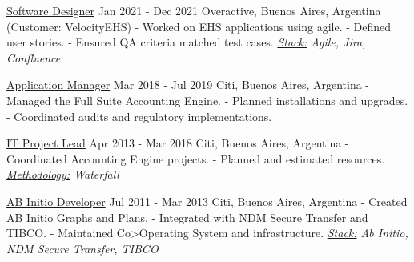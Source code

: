 \documentclass[
	a4paper,
	showframes,
]{ThirtyNinesecondscv}
\begin{document}
{\large\underline{Software Designer}}  \hspace*{22pt} Jan 2021 - Dec 2021
\newline\newline
Overactive, Buenos Aires, Argentina (Customer: VelocityEHS)
\newline- Worked on EHS applications using agile.
\newline- Defined user stories.
\newline- Ensured QA criteria matched test cases.
\newline\textit{\underline{Stack:} Agile, Jira, Confluence}
\newline

{\large\underline{Application Manager}}  \hspace*{22pt} Mar 2018 - Jul 2019
\newline\newline
Citi, Buenos Aires, Argentina
\newline- Managed the Full Suite Accounting Engine.
\newline- Planned installations and upgrades.
\newline- Coordinated audits and regulatory implementations.
\newline

{\large\underline{IT Project Lead}}  \hspace*{22pt} Apr 2013 - Mar 2018
\newline\newline
Citi, Buenos Aires, Argentina
\newline- Coordinated Accounting Engine projects.
\newline- Planned and estimated resources.
\newline\textit{\underline{Methodology:} Waterfall}
\newline

{\large\underline{AB Initio Developer}}  \hspace*{22pt} Jul 2011 - Mar 2013
\newline\newline
Citi, Buenos Aires, Argentina
\newline- Created AB Initio Graphs and Plans.
\newline- Integrated with NDM Secure Transfer and TIBCO.
\newline- Maintained Co>Operating System and infrastructure.
\newline\textit{\underline{Stack:} Ab Initio, NDM Secure Transfer, TIBCO}
\newline
\end{document}
